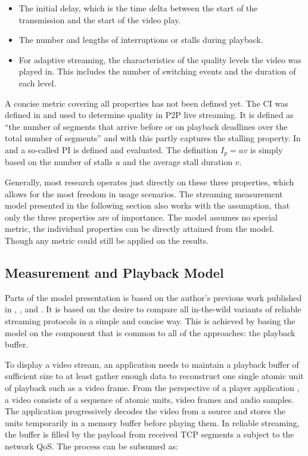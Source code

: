 \begin{itemize}
    \item The initial delay, which is the time delta between the start of the transmission and the start of the video play.
    \item The number and lengths of interruptions or stalls during playback.
    \item For adaptive streaming, the characteristics of the quality levels the video was played in. This includes the number of switching events and the duration of each level.
\end{itemize}

A concise metric covering all properties has not been defined yet. The \gls{CI} was defined in \cite{1498486} and used to determine quality in \gls{P2P} live streaming. It is defined as \enquote{the number of segments that arrive before or on playback deadlines over the total number of segments} and with this partly captures the stalling property. In \cite{5634160} and \cite{DBLP:journals/corr/SeyedebrahimiBP13} a so-called \gls{PI} is defined and evaluated. The definition $I_p = uv$ is simply based on the number of stalls $u$ and the average stall duration $v$. 

Generally, most research operates just directly on these three properties, which allows for the most freedom in usage scenarios. The streaming measurement model presented in the following section also works with the assumption, that only the three properties are of importance. The model assumes no special metric, the individual properties can be directly attained from the model. Though any metric could still be applied on the results.


\subsection{Measurement and Playback Model}
\label{c3:sec:model}

Parts of the model presentation is based on the author's previous work published in \cite{cs3518}, \cite{metzger2011delivery}, and \cite{6229739}. It is based on the desire to compare all in-the-wild variants of reliable streaming protocols in a simple and concise way. This is achieved by basing the model on the component that is common to all of the approaches: the playback buffer.

To display a video stream, an application needs to maintain a playback buffer of sufficient size to at least gather enough data to reconstruct one single atomic unit of playback such as a video frame.
From the perspective of a player application , a video consists of a sequence of atomic units, video frames and audio samples.
The application progressively decodes the video from a source and stores the units temporarily in a memory buffer before playing them. In reliable streaming, the buffer is filled by the payload from received \gls{TCP} segments a subject to the network \gls{QoS}. The process can be subsumed as:

